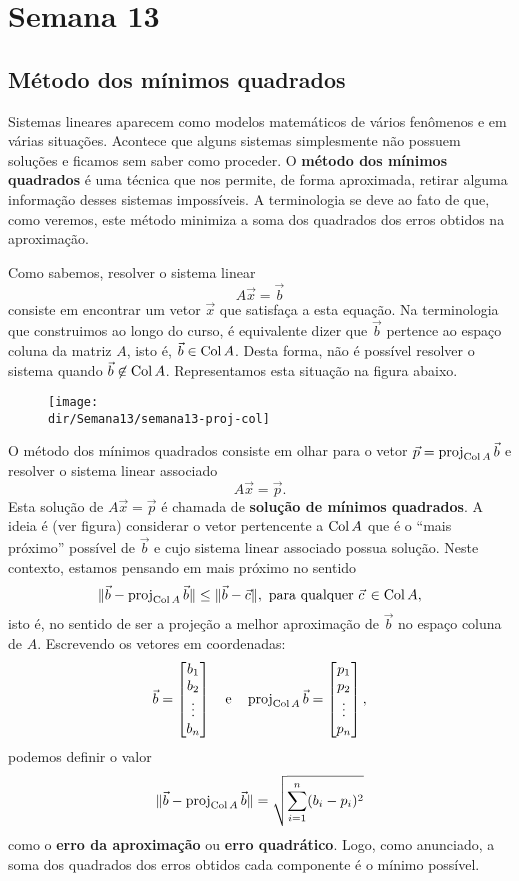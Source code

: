 \documentclass[../livro.tex]{subfiles}  %
\providecommand{\dir}{..}
\begin{document}
	
\chapter{Semana 13}



\section{Método dos mínimos quadrados}

Sistemas lineares aparecem como modelos matemáticos de vários fenômenos e em várias situações. Acontece que alguns sistemas simplesmente não possuem soluções e ficamos sem saber como proceder. O \textbf{método dos mínimos quadrados} é uma técnica que nos permite, de forma aproximada, retirar alguma informação desses sistemas impossíveis. A terminologia se deve ao fato de que, como veremos, este método minimiza a soma dos quadrados dos erros obtidos na aproximação.

Como sabemos, resolver o sistema linear
\[
A \vec{x} = \vec{b}
\] consiste em encontrar um vetor $\vec{x}$ que satisfaça a esta equação. Na terminologia que construimos ao longo do curso, é equivalente dizer que $\vec{b}$ pertence ao espaço coluna da matriz $A$, isto é, $\vec{b} \in \operatorname{Col} A$. Desta forma, não é possível resolver o sistema quando $\vec{b} \not\in \operatorname{Col} A$. Representamos esta situação na figura abaixo.
\begin{figure}[h!]
  \begin{center}
    \texttt{[image: \\dir/Semana13/semana13-proj-col]}
  \end{center}
\end{figure}

O método dos mínimos quadrados consiste em olhar para o vetor $\vec{p} = \operatorname{proj}_{\operatorname{Col} A} \vec{b}$ e resolver o sistema linear associado
\[
A \vec{x} = \vec{p}.
\] Esta solução de $A \vec{x} = \vec{p}$ é chamada de \textbf{solução de mínimos quadrados}. A ideia é (ver figura) considerar o vetor pertencente a $\operatorname{Col} A$ que é o ``mais próximo'' possível de $\vec{b}$ e cujo sistema linear associado possua solução. Neste contexto, estamos pensando em mais próximo no sentido 
\[
\| \vec{b} - \operatorname{proj}_{\operatorname{Col} A} \vec{b} \| \le \| \vec{b} - \vec{c} \|, \text{ para qualquer } \vec{c}\, \in \operatorname{Col} A,
\] isto é, no sentido de ser a projeção a melhor aproximação de $\vec{b}$ no espaço coluna de $A$. Escrevendo os vetores em coordenadas:
\[
\vec{b} =
\begin{bmatrix}
  b_1 \\ b_2 \\ \vdots \\ b_n
\end{bmatrix} \quad \text{e} \quad 
\operatorname{proj}_{\operatorname{Col} A} \vec{b} =
\begin{bmatrix}
  p_1 \\ p_2 \\ \vdots \\ p_n
\end{bmatrix},
\] podemos definir o valor
\[
\| \vec{b} - \operatorname{proj}_{\operatorname{Col} A} \vec{b} \| = \sqrt{\sum_{i=1}^n (b_i - p_i)^2}
\] como o \textbf{erro da aproximação} ou \textbf{erro  quadrático}. Logo, como anunciado, a soma dos quadrados dos erros obtidos cada componente é o mínimo possível.
\end{document}
